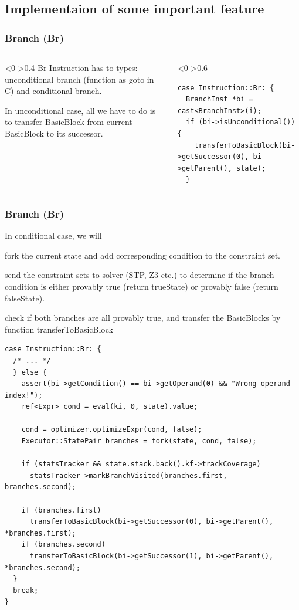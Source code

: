 \documentclass[9pt,aspectratio=43,mathserif,table]{beamer}
\begin{document}
\subsection{Implementaion of some important feature}
\begin{frame}[fragile]
	\frametitle{Branch (Br)}
	\begin{columns}[T]
		\begin{column}<0->{0.4\textwidth}
			Br Instruction has to types: unconditional branch (function as goto in C) and conditional branch.

			In unconditional case, all we have to do is to transfer BasicBlock from current BasicBlock
			to its successor.
		\end{column}
		\hfill
		\begin{column}<0->{0.6\textwidth}
			\begin{lstlisting}
case Instruction::Br: {
  BranchInst *bi = cast<BranchInst>(i);
  if (bi->isUnconditional()) {
    transferToBasicBlock(bi->getSuccessor(0), bi->getParent(), state);
  } 
      \end{lstlisting}
		\end{column}
	\end{columns}
\end{frame}

\begin{frame}[fragile]
	\frametitle{Branch (Br)}
	In conditional case, we will\\
	\begin{itemize}
		 {\item fork the current state and add corresponding condition to the constraint set.\\}
		       {\item send the constraint sets to solver (STP, Z3 etc.) to determine if the
		      branch condition is either provably true (return trueState) or provably false (return falseState).}
		       {\item check if both branches are all provably true, and transfer the BasicBlocks by function transferToBasicBlock }
	\end{itemize}

	\begin{lstlisting}[firstnumber=3]
case Instruction::Br: {
  /* ... */
  } else {
    assert(bi->getCondition() == bi->getOperand(0) && "Wrong operand index!");
    ref<Expr> cond = eval(ki, 0, state).value;

    cond = optimizer.optimizeExpr(cond, false);
    Executor::StatePair branches = fork(state, cond, false);

    if (statsTracker && state.stack.back().kf->trackCoverage)
      statsTracker->markBranchVisited(branches.first, branches.second);

    if (branches.first)
      transferToBasicBlock(bi->getSuccessor(0), bi->getParent(), *branches.first);
    if (branches.second)
      transferToBasicBlock(bi->getSuccessor(1), bi->getParent(), *branches.second);
  }
  break;
}
  \end{lstlisting}
\end{frame}
\end{document}
